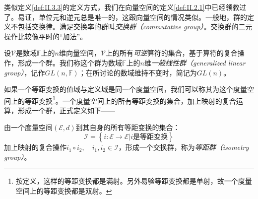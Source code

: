 \documentclass[main.tex]{subfiles}
\begin{document}
类似定义\ref{def:II.3.3}的定义方式，我们在向量空间的定义\ref{def:II.2.1}中已经领教过了。易证，单位元和逆元总是唯一的，这跟向量空间的情况类似。一般地，群的定义不包括交换律。满足交换率的群叫\emph{交换群（commutative group）}。交换群的二元操作比较像平时的“加法”。

\begin{example}
    设$\mathcal{V}$是数域$\mathbb{F}$上的$n$维向量空间，$\mathcal{V}$上的所有\emph{可逆}算符的集合，基于算符的复合操作，形成一个群。我们称这个群为数域$\mathbb{F}$上的$n$维\emph{一般线性群（generalized linear group）}，记作$GL\left(n,\mathbb{F}\right)$；在所讨论的数域维持不变时，简记为$GL\left(n\right)$。
\end{example}

如果一个等距变换的值域与定义域是同一个度量空间，我们可以称其为这个度量空间上的等距变换\footnote{按定义，这样的等距变换都是满射。另外易验等距变换都是单射，故一个度量空间上的等距变换都是双射。}。一个度量空间上的所有等距变换的集合，加上映射的复合运算，形成一个群，正式定义如下——

\begin{definition}[等距群]\label{def:II.3.4}
    由一个度量空间$\left(\mathcal{E},d\right)$到其自身的所有等距变换的集合：
    \[\mathcal{I}=\left\{i:\mathcal{E}\rightarrow\mathcal{E}|i\text{是等距变换}\right\}\]
    加上映射的复合操作$i_1\circ i_2,\quad i_1,i_2\in\mathcal{I}$，形成一个交换群，称为\emph{等距群（isometry group）}。
\end{definition}
\end{document}
